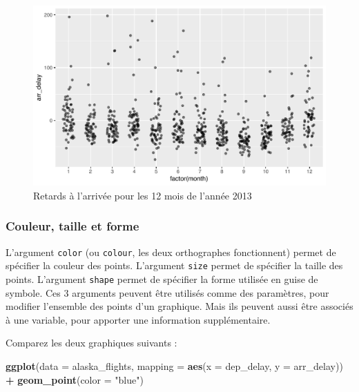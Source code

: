 \documentclass[a4paperpaper,]{article}
\newenvironment{Shaded}{\begin{snugshade}}{\end{snugshade}}
\newcommand{\KeywordTok}[1]{\textcolor[rgb]{0.13,0.29,0.53}{\textbf{#1}}}
\newcommand{\DataTypeTok}[1]{\textcolor[rgb]{0.13,0.29,0.53}{#1}}
\newcommand{\StringTok}[1]{\textcolor[rgb]{0.31,0.60,0.02}{#1}}
\newcommand{\OperatorTok}[1]{\textcolor[rgb]{0.81,0.36,0.00}{\textbf{#1}}}
\newcommand{\NormalTok}[1]{#1}
\theoremstyle{definition}
\theoremstyle{definition}
\theoremstyle{definition}
\theoremstyle{remark}
\begin{document}
\begin{figure}[htpb]

{\centering \includegraphics[width=0.9\linewidth]{figure/unnamed-chunk-42-1} 

}

\caption{Retards à l'arrivée pour les 12 mois de l'année 2013}\label{fig:unnamed-chunk-42}
\end{figure}

\subsubsection{Couleur, taille et forme}\label{couleur-taille-et-forme}

L'argument \texttt{color} (ou \texttt{colour}, les deux orthographes
fonctionnent) permet de spécifier la couleur des points. L'argument
\texttt{size} permet de spécifier la taille des points. L'argument
\texttt{shape} permet de spécifier la forme utilisée en guise de
symbole. Ces 3 arguments peuvent être utilisés comme des paramètres,
pour modifier l'ensemble des points d'un graphique. Mais ils peuvent
aussi être associés à une variable, pour apporter une information
supplémentaire.

Comparez les deux graphiques suivants :

\begin{Shaded}
\begin{Highlighting}[]
\KeywordTok{ggplot}\NormalTok{(}\DataTypeTok{data =}\NormalTok{ alaska_flights, }\DataTypeTok{mapping =} \KeywordTok{aes}\NormalTok{(}\DataTypeTok{x =}\NormalTok{ dep_delay, }\DataTypeTok{y =}\NormalTok{ arr_delay)) }\OperatorTok{+}
\StringTok{  }\KeywordTok{geom_point}\NormalTok{(}\DataTypeTok{color =} \StringTok{"blue"}\NormalTok{)}
\end{Highlighting}
\end{Shaded}
\end{document}
